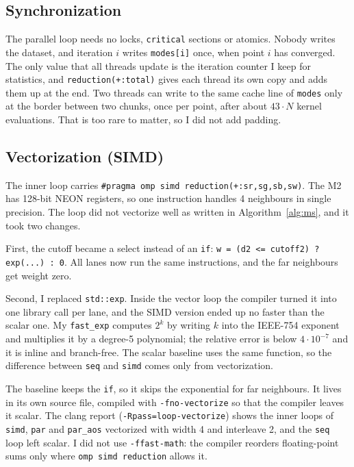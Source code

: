 \documentclass[10pt,twocolumn,letterpaper]{article}
\begin{document}
\subsection{Synchronization}
The parallel loop needs no locks, \texttt{critical} sections or atomics. Nobody writes the dataset,
and iteration $i$ writes \texttt{modes[i]} once, when point $i$ has converged. The only value that
all threads update is the iteration counter I keep for statistics, and \texttt{reduction(+:total)}
gives each thread its own copy and adds them up at the end. Two threads can write to the same cache
line of \texttt{modes} only at the border between two chunks, once per point, after about
$43 \cdot N$ kernel evaluations. That is too rare to matter, so I did not add padding.

\subsection{Vectorization (SIMD)}
The inner loop carries \texttt{\#pragma omp simd reduction(+:sr,sg,sb,sw)}. The M2 has 128-bit
NEON registers, so one instruction handles 4 neighbours in single precision. The loop did not
vectorize well as written in Algorithm~\ref{alg:ms}, and it took two changes.

First, the cutoff became a select instead of an \texttt{if}:
\texttt{w = (d2 <= cutoff2) ? exp(...) : 0}. All lanes now run the same instructions, and the
far neighbours get weight zero.

Second, I replaced \texttt{std::exp}. Inside the vector loop the compiler turned it into one
library call per lane, and the SIMD version ended up no faster than the scalar one. My
\texttt{fast\_exp} computes $2^k$ by writing $k$ into the IEEE-754 exponent and multiplies it by a
degree-5 polynomial; the relative error is below $4\cdot10^{-7}$ and it is inline and branch-free.
The scalar baseline uses the same function, so the difference between \texttt{seq} and
\texttt{simd} comes only from vectorization.

The baseline keeps the \texttt{if}, so it skips the exponential for far neighbours. It lives in its
own source file, compiled with \texttt{-fno-vectorize} so that the compiler leaves it scalar. The clang
report (\texttt{-Rpass=loop-vectorize}) shows the inner loops of \texttt{simd}, \texttt{par} and
\texttt{par\_aos} vectorized with width 4 and interleave 2, and the \texttt{seq} loop left scalar. I
did not use \texttt{-ffast-math}: the compiler reorders floating-point sums only where
\texttt{omp simd reduction} allows it.
\end{document}

